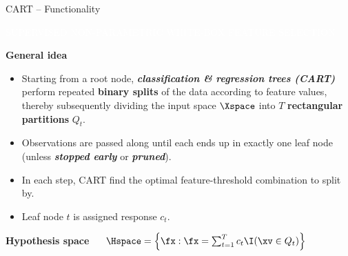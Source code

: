 \documentclass[11pt,compress,t,notes=noshow, xcolor=table]{beamer}
\newcommand{\bfit}[1]{\textbf{\textit{#1}}}
\newcommand{\maketag}[1]{\colorbox{highlightcol}{\textcolor{white}
{\MakeUppercase{#1}}}}
\newcommand{\highlight}[1]{\textcolor{highlightcol}{\textbf{#1}}}
\begin{document}
\begin{frame}{CART -- Functionality}

\footnotesize

\maketag{Supervised}
\maketag{Non-parametric}
\maketag{White-box}
\maketag{Feature selection}

\medskip

\highlight{General idea}
\begin{itemize}
  \item Starting from a root node, \bfit{classification \& regression trees 
  (CART)} perform repeated \textbf{binary splits} of the data according to feature 
  values, thereby subsequently dividing the input space $\Xspace$ into $T$ 
  \textbf{rectangular partitions} $Q_t$.
  \item Observations are passed along until each ends up in exactly one leaf 
  node (unless \bfit{stopped early} or \bfit{pruned}).
  \item In each step, CART find the optimal feature-threshold combination to 
  split by.
  \item Leaf node $t$ is assigned response $c_t$.
\end{itemize}

\medskip
 
\highlight{Hypothesis space} ~~
$\Hspace = \left\{ \fx: \fx = \sum_{t = 1}^T c_t \I(\xv \in Q_t) 
\right\}$


\end{frame}
\end{document}
